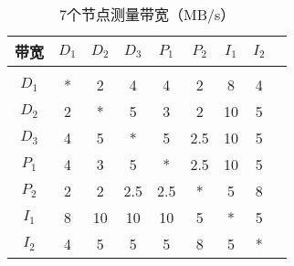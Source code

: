 \begin{table}[tb!]
	\centering
	\caption{7个节点测量带宽（MB/s）}
	\begin{tabular}{ccccccccc}
		\toprule
		\textsc{带宽}                       & \textsc{$D_1$}    & \textsc{$D_2$}    & \textsc{$D_3$}    & \textsc{$P_1$}   & \textsc{$P_2$}      & \textsc{$I_1$}   & \textsc{$I_2$}      \\[1pt]
		\midrule
		\\[-15pt]
		\textsc{$D_1$}                      & *              & 2              & 4           & 4       & 2       & 8      & 4         \\
		\textsc{$D_2$}                      & 2              & *              & 5           & 3       & 2       & 10      & 5        \\
		\textsc{$D_3$}                      & 4              & 5              & *           & 5       & 2.5     & 10      & 5        \\
		\textsc{$P_1$}                      & 4              & 3              & 5           & *       & 2.5     & 10      & 5        \\
		\textsc{$P_2$}                      & 2              & 2              & 2.5         & 2.5     & *       & 5      & 8         \\
		\textsc{$I_1$}                      & 8              & 10             & 10          & 10      & 5       & *      & 5         \\
		\textsc{$I_2$}                      & 4              & 5              & 5           & 5       & 8       & 5      & *         \\
         \bottomrule
	\end{tabular}
	\label{table:3-1}
\end{table}

